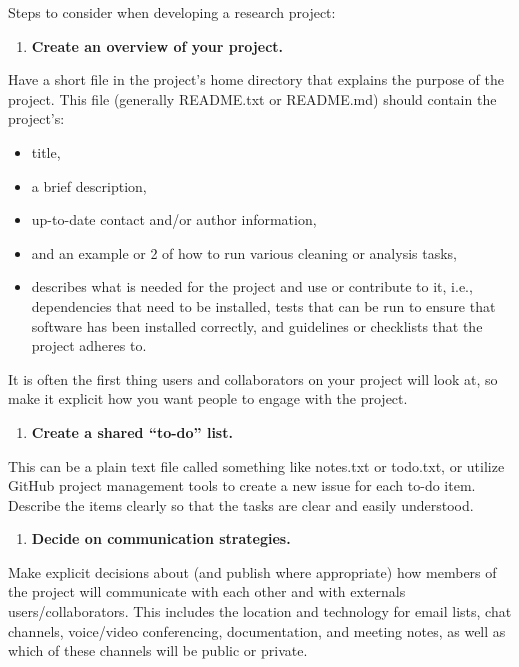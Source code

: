 \documentclass[
]{book}
\providecommand{\tightlist}{%
  \setlength{\itemsep}{0pt}\setlength{\parskip}{0pt}}
\begin{document}
Steps to consider when developing a research project:

\begin{enumerate}
\def\labelenumi{\arabic{enumi}.}
\tightlist
\item
  \textbf{Create an overview of your project.}
\end{enumerate}

Have a short file in the project's home directory that explains the purpose of the project. This file (generally README.txt or README.md) should contain the project's:

\begin{itemize}
\tightlist
\item
  title,
\item
  a brief description,
\item
  up-to-date contact and/or author information,
\item
  and an example or 2 of how to run various cleaning or analysis tasks,
\item
  describes what is needed for the project and use or contribute to it, i.e., dependencies that need to be installed, tests that can be run to ensure that software has been installed correctly, and guidelines or checklists that the project adheres to.
\end{itemize}

It is often the first thing users and collaborators on your project will look at, so make it explicit how you want people to engage with the project.

\begin{enumerate}
\def\labelenumi{\arabic{enumi}.}
\setcounter{enumi}{1}
\tightlist
\item
  \textbf{Create a shared ``to-do'' list.}
\end{enumerate}

This can be a plain text file called something like notes.txt or todo.txt, or utilize GitHub project management tools to create a new issue for each to-do item. Describe the items clearly so that the tasks are clear and easily understood.

\begin{enumerate}
\def\labelenumi{\arabic{enumi}.}
\setcounter{enumi}{2}
\tightlist
\item
  \textbf{Decide on communication strategies.}
\end{enumerate}

Make explicit decisions about (and publish where appropriate) how members of the project will communicate with each other and with externals users/collaborators. This includes the location and technology for email lists, chat channels, voice/video conferencing, documentation, and meeting notes, as well as which of these channels will be public or private.
\end{document}
